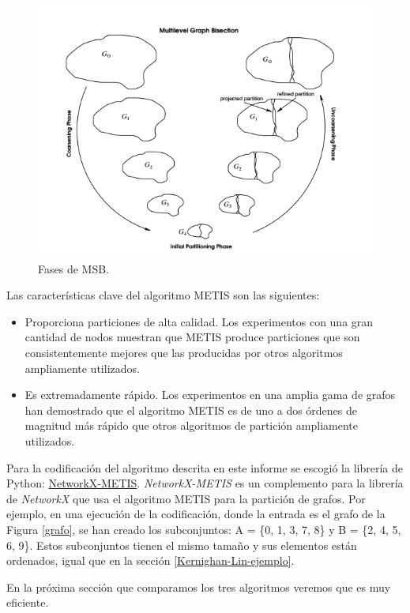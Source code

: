 \begin{figure}[h]
	\centering
	\includegraphics[scale=0.9]{Figures/fases}
	\vspace{2mm}
	\caption{Fases de MSB.}
	\label{fases}
\end{figure}

\newpage
Las características clave del algoritmo METIS son las siguientes:

\begin{itemize}
	\item Proporciona particiones de alta calidad. Los experimentos con una gran cantidad de nodos muestran que METIS produce particiones que son consistentemente mejores que las producidas por otros algoritmos ampliamente utilizados. 
	\item Es extremadamente rápido. Los experimentos en una amplia gama de grafos han demostrado que el algoritmo METIS es de uno a dos órdenes de magnitud más rápido que otros algoritmos de partición ampliamente utilizados.
\end{itemize}

Para la codificación del algoritmo descrita en este informe se escogió la librería de Python: \href{https://networkx-metis.readthedocs.io/en/latest/reference/generated/nxmetis.partition.html#nxmetis.partition}{NetworkX-METIS}. \textit{NetworkX-METIS} es un complemento para la librería de \textit{NetworkX} que usa el algoritmo METIS para la partición de grafos. Por ejemplo, en una ejecución de la codificación, donde la entrada es el grafo de la Figura \ref{grafo}, se han creado los subconjuntos: A = \{0, 1, 3, 7, 8\} y B = \{2, 4, 5, 6, 9\}. Estos subconjuntos tienen el mismo tamaño y sus elementos están ordenados, igual que en la sección \ref{Kernighan-Lin-ejemplo}.

En la próxima sección que comparamos los tres algoritmos veremos que es muy eficiente.